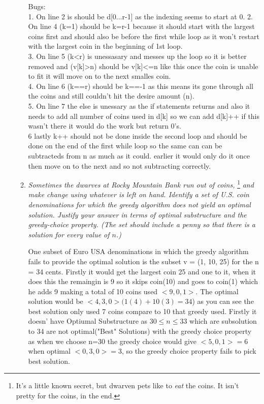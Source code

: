 \documentclass[12pt]{article}
\begin{document}
\begin{enumerate}
\begin{enumerate}
	Bugs: \\
	1. On line 2 is should be d[0...r-1] as the indexing seems to start at 0.
	2. On line 4 (k=1) should be k=r-1 because it should start with the largest coins first and should also be before the first while loop as it won't restart with the largest coin in the beginning of 1st loop. \\
	3. On line 5 (k<r) is unessasary and messes up the loop so it is better removed and (v[k]>n) should be v[k]<=n like this once the coin is unable to fit it will move on to the next smalles coin. \\
	4. On line 6 (k==r) should be k==-1 as this means its gone through all the coins and still couldn't hit the desire amount (n). \\
	5. On line 7 the else is unessary as the if statements returns and also it needs to add all number of coins used in d[k] so we can add d[k]++ if this wasn't there it would do the work but return 0's.\\
	6  lastly k++ should not be done inside the second loop and should be done on the end of the first while loop so the same can can be subtracteds from n as much as it could. earlier it would only do it once then move on to the next and so not subtracting correctly.\\
	
	\item\textit{  Sometimes the dwarves at Rocky Mountain Bank run out of coins,}%
	\footnote{It's a little known secret, but dwarven pets like to \textit{eat} the coins. It isn't pretty for the coins, in the end.}
	\textit{ and make change using whatever is left on hand. Identify a set of U.S. coin denominations for which the greedy algorithm does not yield an optimal solution. Justify your answer in terms of optimal substructure and the greedy-choice property. (The set should include a penny so that there is a solution for every value of $n$.)}

One subset of Euro USA denominations in which the greedy algorithm fails to provide the optimal solution is the subset v = (1, 10, 25) for the n = 34 cents. Firstly it would get the largest coin 25 and one to it, when it does this the remaingin is 9 so it skips coin(10) and goes to coin(1) which he adds 9 making a total of 10 coins used $<9,0,1>$. The optimal solution would be $<4,3,0> (1(4)+10(3) = 34$) as you can see the best solution only used 7 coins compare to 10 that greedy used. Firstly it doesn' have Optiumal Substructure as $30 \leq n \leq 33$ which are subsolution to 34 are not optimal("Best" Solutions) with the greedy choice property as when we choose n=30 the greedy choice would give $<5, 0, 1>= 6$ when optimal $<0,3,0>=3$, so the greedy choice property fails to pick best solution.


\end{enumerate}
\end{enumerate}
\end{document}
